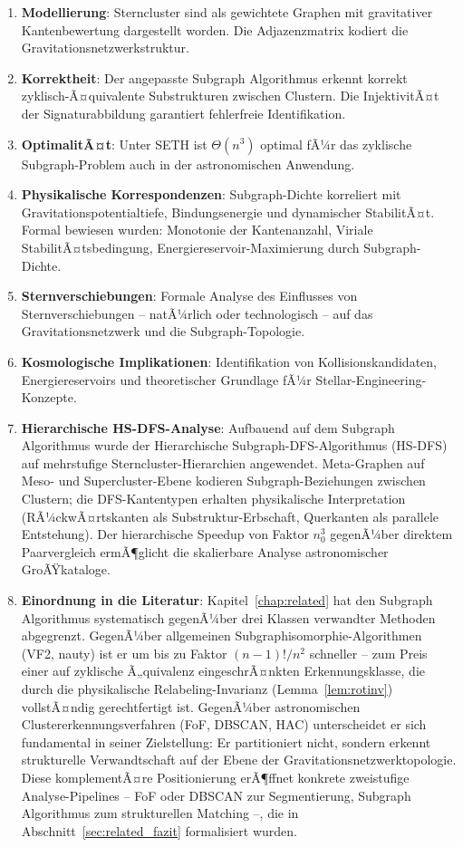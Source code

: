 ﻿\documentclass[a4paper,12pt]{report}
\theoremstyle{definition}
\begin{document}
\begin{enumerate}
    \item \textbf{Modellierung}: Sterncluster sind als gewichtete Graphen mit gravitativer Kantenbewertung dargestellt worden. Die Adjazenzmatrix kodiert die Gravitationsnetzwerkstruktur.
    \item \textbf{Korrektheit}: Der angepasste Subgraph Algorithmus erkennt korrekt zyklisch-Ã¤quivalente Substrukturen zwischen Clustern. Die InjektivitÃ¤t der Signaturabbildung garantiert fehlerfreie Identifikation.
    \item \textbf{OptimalitÃ¤t}: Unter SETH ist $\Theta(n^3)$ optimal fÃ¼r das zyklische Subgraph-Problem auch in der astronomischen Anwendung.
    \item \textbf{Physikalische Korrespondenzen}: Subgraph-Dichte korreliert mit Gravitationspotentialtiefe, Bindungsenergie und dynamischer StabilitÃ¤t. Formal bewiesen wurden: Monotonie der Kantenanzahl, Viriale StabilitÃ¤tsbedingung, Energiereservoir-Maximierung durch Subgraph-Dichte.
    \item \textbf{Sternverschiebungen}: Formale Analyse des Einflusses von Sternverschiebungen -- natÃ¼rlich oder technologisch -- auf das Gravitationsnetzwerk und die Subgraph-Topologie.
    \item \textbf{Kosmologische Implikationen}: Identifikation von Kollisionskandidaten, Energiereservoirs und theoretischer Grundlage fÃ¼r Stellar-Engineering-Konzepte.
    \item \textbf{Hierarchische HS-DFS-Analyse}: Aufbauend auf dem Subgraph Algorithmus wurde der Hierarchische Subgraph-DFS-Algorithmus (HS-DFS) auf mehrstufige Sterncluster-Hierarchien angewendet. Meta-Graphen auf Meso- und Supercluster-Ebene kodieren Subgraph-Beziehungen zwischen Clustern; die DFS-Kantentypen erhalten physikalische Interpretation (RÃ¼ckwÃ¤rtskanten als Substruktur-Erbschaft, Querkanten als parallele Entstehung). Der hierarchische Speedup von Faktor $n_0^3$ gegenÃ¼ber direktem Paarvergleich ermÃ¶glicht die skalierbare Analyse astronomischer GroÃŸkataloge.
    \item \textbf{Einordnung in die Literatur}: Kapitel~\ref{chap:related} hat den Subgraph Algorithmus systematisch gegenÃ¼ber drei Klassen verwandter Methoden abgegrenzt. GegenÃ¼ber allgemeinen Subgraphisomorphie-Algorithmen (VF2, nauty) ist er um bis zu Faktor $(n-1)!/n^2$ schneller -- zum Preis einer auf zyklische Ã„quivalenz eingeschrÃ¤nkten Erkennungsklasse, die durch die physikalische Relabeling-Invarianz (Lemma~\ref{lem:rotinv}) vollstÃ¤ndig gerechtfertigt ist. GegenÃ¼ber astronomischen Clustererkennungsverfahren (FoF, DBSCAN, HAC) unterscheidet er sich fundamental in seiner Zielstellung: Er partitioniert nicht, sondern erkennt strukturelle Verwandtschaft auf der Ebene der Gravitationsnetzwerktopologie. Diese komplementÃ¤re Positionierung erÃ¶ffnet konkrete zweistu\-fige Analyse-Pipelines -- FoF oder DBSCAN zur Segmentierung, Subgraph Algorithmus zum strukturellen Matching --, die in Abschnitt~\ref{sec:related_fazit} formalisiert wurden.
\end{enumerate}
\end{document}
